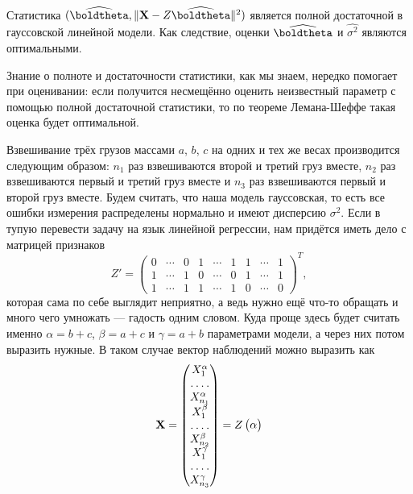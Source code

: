 \begin{theorem}[label=suff_stat_for_linreg]{}{}
Статистика $(\widehat{\boldtheta}, \|\mathbf X - Z \widehat{\boldtheta}\|^2)$ является полной достаточной в гауссовской линейной модели. Как следствие, оценки $\widehat{\boldtheta}$ и $\widehat{\sigma^2}$ являются оптимальными.
\end{theorem}

Знание о полноте и достаточности статистики, как мы знаем, нередко помогает при оценивании: если получится несмещённо оценить неизвестный параметр с помощью полной достаточной статистики, то по теореме Лемана-Шеффе такая оценка будет оптимальной.

\begin{example}\label{gauss_example}
Взвешивание трёх грузов массами $a$, $b$, $c$ на одних и тех же весах производится следующим образом: $n_1$ раз взвешиваются второй и третий груз вместе, $n_2$ раз взвешиваются первый и третий груз вместе и $n_3$ раз взвешиваются первый и второй груз вместе. Будем считать, что наша модель гауссовская, то есть все ошибки измерения распределены нормально и имеют дисперсию $\sigma^2$. Если в тупую перевести задачу на язык линейной регрессии, нам придётся иметь дело с матрицей признаков
\[
Z' =
\begin{pmatrix}
0 & \cdots & 0 & 1 & \cdots & 1 & 1 & \cdots & 1\\
1 & \cdots & 1 & 0 & \cdots & 0 & 1 & \cdots & 1\\
1 & \cdots & 1 & 1 & \cdots & 1 & 0 & \cdots & 0
\end{pmatrix}^T,
\]
которая сама по себе выглядит неприятно, а ведь нужно ещё что-то обращать и много чего умножать --- гадость одним словом. Куда проще здесь будет считать именно $\alpha = b+c$, $\beta = a+c$ и $\gamma = a+b$ параметрами модели, а через них потом выразить нужные. В таком случае вектор наблюдений можно выразить как
\[
\mathbf X = 
\begin{pmatrix}
X^{\alpha}_1\\
\hdotsfor{1}\\
X^{\alpha}_{n_1}\\
X^{\beta}_1\\
\hdotsfor{1}\\
X^{\beta}_{n_2}\\
X^{\gamma}_1\\
\hdotsfor{1}\\
X^{\gamma}_{n_3}
\end{pmatrix}
= Z
\begin{pmatrix}
\alpha\\

\end{pmatrix}\]
\end{example}
